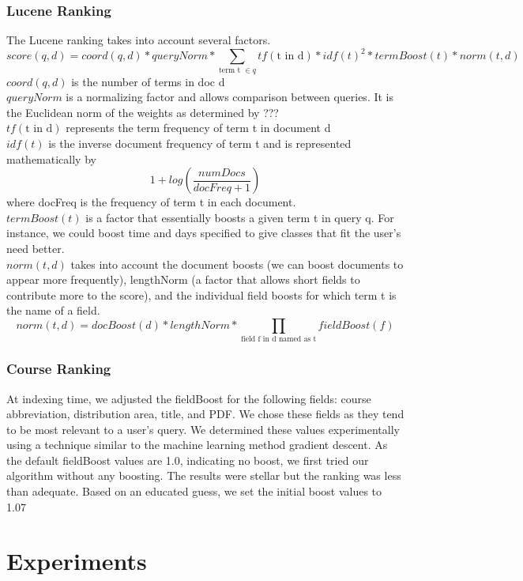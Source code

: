 \documentclass[12pt,letterpaper]{article}
\begin{document}
\subsubsection{Lucene Ranking}
The Lucene ranking takes into account several factors. 
\begin{equation}
  score(q,d) = coord(q,d) * queryNorm * \sum_{\text{term t } \in q}{tf(\text{t in d}) * idf(t)^2 * termBoost(t) * norm(t,d)}
  \label{eq:practical}
\end{equation}
$coord(q,d)$ is the number of terms in doc d\\
$queryNorm$ is a normalizing factor and allows comparison between queries. It is the Euclidean norm of the weights as determined by ???\\
$tf(\text{t in d})$ represents the term frequency of term t in document d \\
$idf(t)$ is the inverse document frequency of term t and is represented mathematically by \[ 1 + log(\frac{numDocs}{docFreq + 1}) \] where docFreq is the frequency of term t in each document. \\
$termBoost(t)$ is a factor that essentially boosts a given term t in query q. For instance, we could boost time and days specified to give classes that fit the user's need better.\\
$norm(t, d)$ takes into account the document boosts (we can boost documents to appear more frequently), lengthNorm (a factor that allows short fields to contribute more to the score), and the individual field boosts for which term t is the name of a field. 
\[ norm(t,d) = docBoost(d) * lengthNorm * \prod_{\text{field f in d named as t}}{fieldBoost(f)} \] 				

\subsubsection{Course Ranking}
At indexing time, we adjusted the fieldBoost for the following fields: course abbreviation, distribution area, title, and PDF. We chose these fields as they tend to be most relevant to a user's query. We determined these values experimentally using a technique similar to the machine learning method gradient descent. As the default fieldBoost values are 1.0, indicating no boost, we first tried our algorithm without any boosting. The results were stellar but the ranking was less than adequate. Based on an educated guess, we set the initial boost values to 1.07

\section{Experiments}
\end{document}
